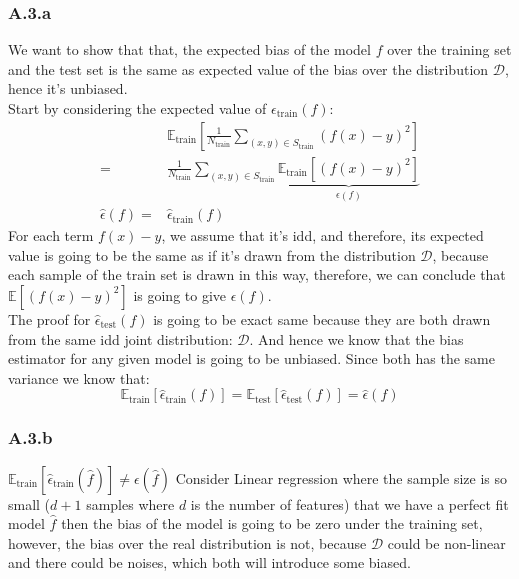 \documentclass[]{article}
\begin{document}
    \subsubsection*{A.3.a}
        We want to show that that, the expected bias of the model $f$ over the training set and the test set is the same as expected value of the bias over the distribution $\mathcal{D}$, hence it's unbiased. 
        \\[1em]
        Start by considering the expected value of $\epsilon_\text{train}(f)$: 
        \begin{align*}\tag{A.3.a.1}\label{eqn:A.3.a.1}
            & \mathbb{E}_{\text{train}}\left[\frac{1}{N_\text{train}}
            \sum_{(x, y)\in S_\text{train}}^{}\left(
                f(x) - y
            \right)^2\right]
            \\
            = &
            \frac{1}{N_\text{train}} 
            \sum_{(x, y)\in S_\text{train}}^{}
            \underbrace{
                \mathbb{E}_{\text{train}}
                \left[ 
                \left(
                    f(x) - y
                \right)^2\right]
            }_{\epsilon(f)}
            \\
            \hat{\epsilon}(f)
            = &
            \hat{\epsilon}_{\text{train}}(f)
        \end{align*}
        For each term $f(x) - y$, we assume that it's idd, and therefore, its expected value is going to be the same as if it's drawn from the distribution $\mathcal{D}$, because each sample of the train set is drawn in this way, therefore, we can conclude that $\mathbb{E}\left[(f(x) - y)^2\right]$ is going to give $\epsilon(f)$. 
        \\[1em]
        The proof for $\hat{\epsilon}_\text{test}(f)$ is going to be exact same because they are both drawn from the same idd joint distribution: $\mathcal{D}$. And hence we know that the bias estimator for any given model is going to be unbiased. Since both has the same variance we know that: 
        \begin{equation*}\tag{A.3.a.2}\label{eqn:A.3.a.2}
            \mathbb{E}_\text{train}\left[\hat{\epsilon}_\text{train}(f)\right]
            =
            \mathbb{E}_\text{test}\left[\hat{\epsilon}_\text{test}(f)\right]
            =
            \hat{\epsilon}(f) 
        \end{equation*}
    \subsubsection*{A.3.b}
        $\mathbb{E}_{\text{train}}\left[\hat{\epsilon}_\text{train}(\hat{f})\right]\ne \epsilon(\hat{f})$ Consider Linear regression where the sample size is so small ($d + 1$ samples where $d$ is the number of features) that we have a perfect fit model $\hat{f}$ then the bias of the model is going to be zero under the training set, however, the bias over the real distribution is not, because $\mathcal{D}$ could be non-linear and there could be noises, which both will introduce some biased. 
\end{document}
